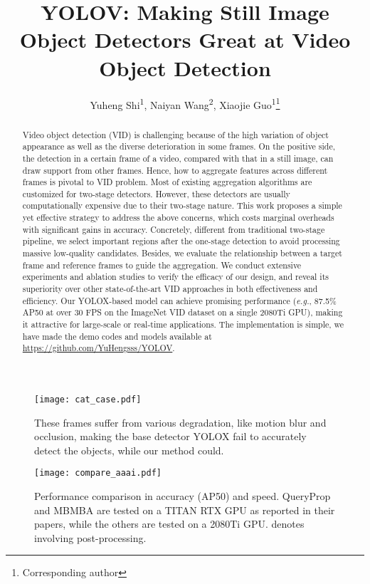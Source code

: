 \documentclass[letterpaper]{article} \usepackage{aaai23}  \usepackage{times}  \usepackage{helvet}  \usepackage{courier}  \usepackage[hyphens]{url}  \usepackage{graphicx} \urlstyle{rm} \def\UrlFont{\rm}  \usepackage{natbib}  \usepackage{caption} \usepackage{xcolor}
\title{YOLOV: Making Still Image Object Detectors Great at Video Object Detection}
\author {
Yuheng Shi\textsuperscript{\rm 1},
    Naiyan Wang\textsuperscript{\rm 2},
    Xiaojie Guo\textsuperscript{\rm 1}\thanks{Corresponding author}
}
\begin{document}
\maketitle

\begin{abstract}
Video object detection (VID) is challenging because of the high variation of object appearance as well as the diverse deterioration in some frames. On the positive side, the detection in a certain frame of a video, compared with that in a still image, can draw support from other frames. Hence, how to aggregate features across different frames is pivotal to VID problem. Most of existing aggregation algorithms are customized for two-stage detectors. However, these detectors are usually computationally expensive due to their two-stage nature. This work proposes a simple yet effective strategy to address the above concerns, which costs marginal overheads with significant gains in accuracy. Concretely, different from traditional two-stage pipeline, we select important regions after the one-stage detection to avoid processing massive low-quality candidates. Besides, we evaluate the relationship between a target frame and reference frames to guide the aggregation. We conduct extensive experiments and ablation studies to verify the efficacy of our design, and reveal its superiority over other state-of-the-art VID approaches in both effectiveness and efficiency. Our YOLOX-based model can achieve promising performance (\emph{e.g.}, 87.5\% AP50 at over 30 FPS on the ImageNet VID dataset on a single 2080Ti GPU), making it attractive for large-scale or real-time applications. The implementation is simple, we have made the demo codes and models available at \url{https://github.com/YuHengsss/YOLOV}.
\end{abstract}

\begin{figure}[!ht]
\centering
\texttt{[image: cat\_case.pdf]}
\caption{These frames suffer from various degradation, like motion blur and occlusion, making the base detector YOLOX fail to accurately detect the objects, while our method could.}
\label{fig:cat_case}

\centering
\texttt{[image: compare\_aaai.pdf]}
\caption{Performance comparison in accuracy (AP50) and speed. QueryProp and MBMBA are tested on a TITAN RTX GPU as reported in their papers, while the others are tested on a 2080Ti GPU.  denotes involving post-processing.}
\label{fig:performance}
\end{figure}
\end{document}
